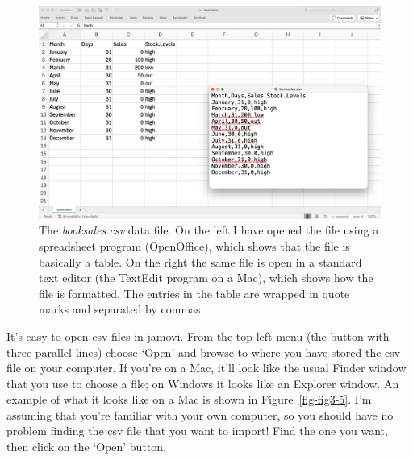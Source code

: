 \documentclass[
  a4paper,
]{book}
\begin{document}
\begin{figure}

\includegraphics[width=1\textwidth,height=\textheight]{images/fig3-4.png} \hfill{}

\caption{\label{fig-fig3-4}The \emph{booksales.csv} data file. On the
left I have opened the file using a spreadsheet program (OpenOffice),
which shows that the file is basically a table. On the right the same
file is open in a standard text editor (the TextEdit program on a Mac),
which shows how the file is formatted. The entries in the table are
wrapped in quote marks and separated by commas}

\end{figure}

It's easy to open csv files in jamovi. From the top left menu (the
button with three parallel lines) choose `Open' and browse to where you
have stored the csv file on your computer. If you're on a Mac, it'll
look like the usual Finder window that you use to choose a file; on
Windows it looks like an Explorer window. An example of what it looks
like on a Mac is shown in Figure~\ref{fig-fig3-5}. I'm assuming that
you're familiar with your own computer, so you should have no problem
finding the csv file that you want to import! Find the one you want,
then click on the `Open' button.
\end{document}
